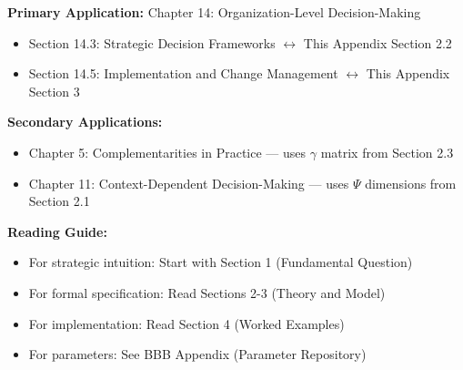 %
%



\begin{tcolorbox}[colback=purple!5!white, colframe=purple!75!black,
    title=Chapter Linkage: Corporate Strategy Design]

\textbf{Primary Application:} Chapter 14: Organization-Level Decision-Making
\begin{itemize}[nosep]
\item Section 14.3: Strategic Decision Frameworks $\leftrightarrow$ This Appendix Section 2.2
\item Section 14.5: Implementation and Change Management $\leftrightarrow$ This Appendix Section 3
\end{itemize}

\textbf{Secondary Applications:}
\begin{itemize}[nosep]
\item Chapter 5: Complementarities in Practice --- uses $\gamma$ matrix from Section 2.3
\item Chapter 11: Context-Dependent Decision-Making --- uses $\Psi$ dimensions from Section 2.1
\end{itemize}

\textbf{Reading Guide:}
\begin{itemize}[nosep]
\item For strategic intuition: Start with Section 1 (Fundamental Question)
\item For formal specification: Read Sections 2-3 (Theory and Model)
\item For implementation: Read Section 4 (Worked Examples)
\item For parameters: See BBB Appendix (Parameter Repository)
\end{itemize}

\end{tcolorbox}

